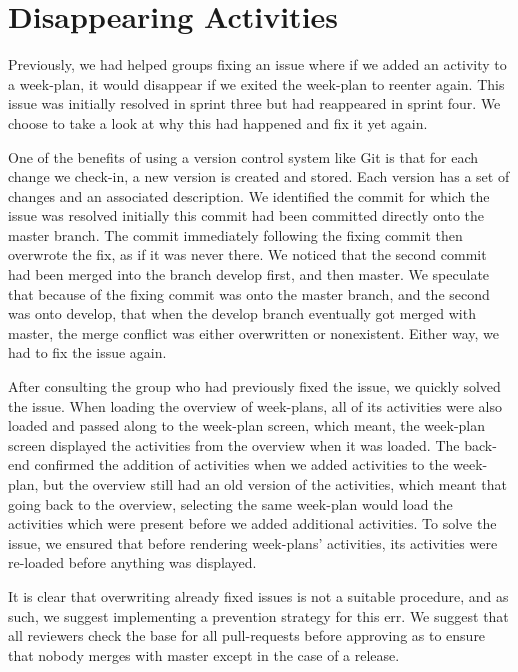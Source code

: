 \section{Disappearing Activities}

Previously, we had helped groups fixing an issue where if we added an activity to a week-plan, it would disappear if we exited the week-plan to reenter again. This issue was initially resolved in sprint three but had reappeared in sprint four. We choose to take a look at why this had happened and fix it yet again.

One of the benefits of using a version control system like Git is that for each change we check-in, a new version is created and stored. Each version has a set of changes and an associated description. We identified the commit for which the issue was resolved initially \cite{weekplan_issue_257_fix} this commit had been committed directly onto the master branch. The commit immediately following the fixing commit \cite{weekplan_issue_257_fix-2} then overwrote the fix, as if it was never there. We noticed that the second commit had been merged into the branch develop first, and then master. We speculate that because of the fixing commit was onto the master branch, and the second was onto develop, that when the develop branch eventually got merged with master, the merge conflict was either overwritten or nonexistent. Either way, we had to fix the issue again. 

After consulting the group who had previously fixed the issue, we quickly solved the issue. When loading the overview of week-plans, all of its activities were also loaded and passed along to the week-plan screen, which meant, the week-plan screen displayed the activities from the overview when it was loaded. The back-end confirmed the addition of activities when we added activities to the week-plan, but the overview still had an old version of the activities, which meant that going back to the overview, selecting the same week-plan would load the activities which were present before we added additional activities. To solve the issue, we ensured that before rendering week-plans' activities, its activities were re-loaded before anything was displayed.

It is clear that overwriting already fixed issues is not a suitable procedure, and as such, we suggest implementing a prevention strategy for this err. We suggest that all reviewers check the base for all pull-requests before approving as to ensure that nobody merges with master except in the case of a release.
